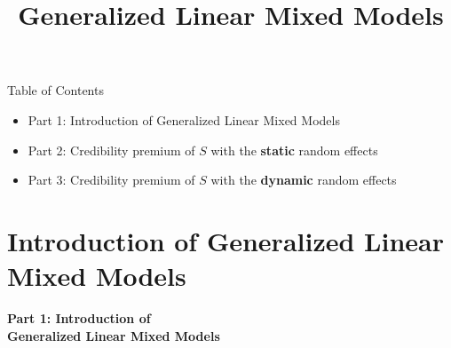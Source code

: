 \documentclass[ignorenonframetext,]{beamer}
\title{Generalized Linear Mixed Models}
\begin{document}
\frame{\titlepage}

\begin{frame}{Table of Contents}
\begin{itemize}
	\item Part 1: Introduction of Generalized Linear Mixed Models
	\vspace{8pt}
	\item Part 2: Credibility premium of $S$ with the \textbf{static} random effects
	\vspace{8pt}
	\item Part 3: Credibility premium of $S$ with the \textbf{dynamic} random effects
\end{itemize}
\end{frame}

\section{Introduction of Generalized Linear Mixed Models}

\begin{frame}
\centering
\Large\textbf{Part 1: Introduction of\\ Generalized Linear Mixed Models}
\end{frame}
\end{document}
